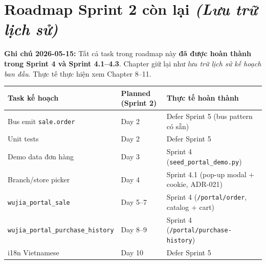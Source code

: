 \chapter{Roadmap Sprint 2 còn lại \emph{(Lưu trữ lịch sử)}}

\textbf{Ghi chú 2026-05-15:} Tất cả task trong roadmap này \textbf{đã được hoàn thành trong Sprint 4 và Sprint 4.1--4.3}. Chapter giữ lại như \emph{lưu trữ lịch sử kế hoạch ban đầu}. Thực tế thực hiện xem Chapter 8--11.

\begin{longtable}{p{3.5cm} p{4.5cm} p{6cm}}
\toprule
\textbf{Task kế hoạch} & \textbf{Planned (Sprint 2)} & \textbf{Thực tế hoàn thành} \\
\midrule
\endhead
Bus emit \texttt{sale.order} & Day 2 & Defer Sprint 5 (bus pattern có sẵn) \\
Unit tests & Day 2 & Defer Sprint 5 \\
Demo data đơn hàng & Day 3 & Sprint 4 (\texttt{seed\_portal\_demo.py}) \\
Branch/store picker & Day 4 & Sprint 4.1 (pop-up modal + cookie, ADR-021) \\
\texttt{wujia\_portal\_sale} & Day 5--7 & Sprint 4 (\texttt{/portal/order}, catalog + cart) \\
\texttt{wujia\_portal\_purchase\_history} & Day 8--9 & Sprint 4 (\texttt{/portal/purchase-history}) \\
i18n Vietnamese & Day 10 & Defer Sprint 5 \\
\bottomrule
\end{longtable}

